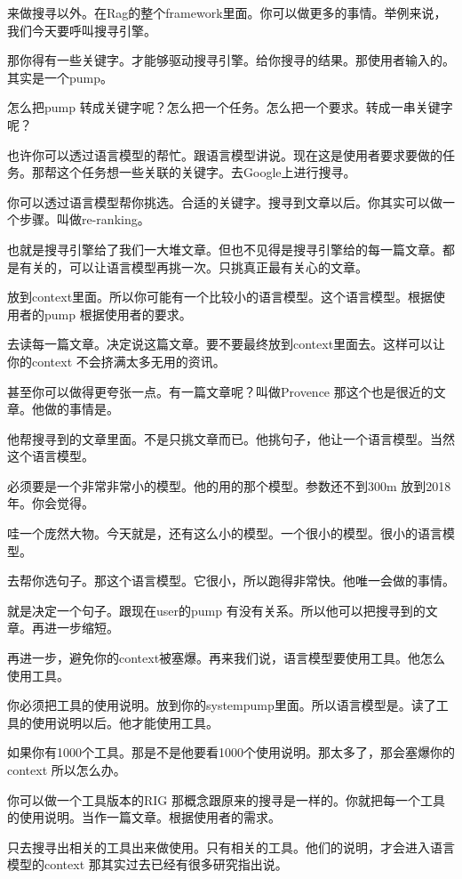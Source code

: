 \documentclass[12pt,a4paper]{article}
\begin{document}
来做搜寻以外。在Rag的整个framework里面。你可以做更多的事情。举例来说，我们今天要呼叫搜寻引擎。

那你得有一些关键字。才能够驱动搜寻引擎。给你搜寻的结果。那使用者输入的。其实是一个pump。

怎么把pump 转成关键字呢？怎么把一个任务。怎么把一个要求。转成一串关键字呢？

也许你可以透过语言模型的帮忙。跟语言模型讲说。现在这是使用者要求要做的任务。那帮这个任务想一些关联的关键字。去Google上进行搜寻。

你可以透过语言模型帮你挑选。合适的关键字。搜寻到文章以后。你其实可以做一个步骤。叫做re-ranking。

也就是搜寻引擎给了我们一大堆文章。但也不见得是搜寻引擎给的每一篇文章。都是有关的，可以让语言模型再挑一次。只挑真正最有关心的文章。

放到context里面。所以你可能有一个比较小的语言模型。这个语言模型。根据使用者的pump 根据使用者的要求。

去读每一篇文章。决定说这篇文章。要不要最终放到context里面去。这样可以让你的context 不会挤满太多无用的资讯。

甚至你可以做得更夸张一点。有一篇文章呢？叫做Provence 那这个也是很近的文章。他做的事情是。

他帮搜寻到的文章里面。不是只挑文章而已。他挑句子，他让一个语言模型。当然这个语言模型。

必须要是一个非常非常小的模型。他的用的那个模型。参数还不到300m 放到2018年。你会觉得。

哇一个庞然大物。今天就是，还有这么小的模型。一个很小的模型。很小的语言模型。

去帮你选句子。那这个语言模型。它很小，所以跑得非常快。他唯一会做的事情。

就是决定一个句子。跟现在user的pump 有没有关系。所以他可以把搜寻到的文章。再进一步缩短。

再进一步，避免你的context被塞爆。再来我们说，语言模型要使用工具。他怎么使用工具。

你必须把工具的使用说明。放到你的systempump里面。所以语言模型是。读了工具的使用说明以后。他才能使用工具。

如果你有1000个工具。那是不是他要看1000个使用说明。那太多了，那会塞爆你的context 所以怎么办。

你可以做一个工具版本的RIG 那概念跟原来的搜寻是一样的。你就把每一个工具的使用说明。当作一篇文章。根据使用者的需求。

只去搜寻出相关的工具出来做使用。只有相关的工具。他们的说明，才会进入语言模型的context 那其实过去已经有很多研究指出说。
\end{document}
